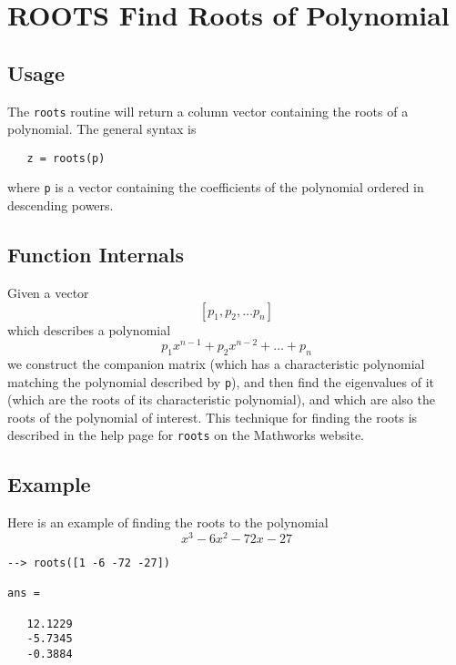 \section{ROOTS Find Roots of Polynomial}

\subsection{Usage}

The \verb|roots| routine will return a column vector containing the
roots of a polynomial.  The general syntax is
\begin{verbatim}
   z = roots(p)
\end{verbatim}
where \verb|p| is a vector containing the coefficients of the polynomial
ordered in descending powers.  
\subsection{Function Internals}

Given a vector 
\[
   [p_1, p_2, \dots p_n]
\]
which describes a polynomial
\[
   p_1 x^{n-1} + p_2 x^{n-2} + \dots + p_n
\]
we construct the companion matrix (which has a characteristic polynomial
matching the polynomial described by \verb|p|), and then find the eigenvalues
of it (which are the roots of its characteristic polynomial), and
which are also the roots of the polynomial of interest.  This technique
for finding the roots is described in the help page for \verb|roots| on the Mathworks
website.
\subsection{Example}

Here is an example of finding the roots to the polynomial
\[
   x^3 - 6x^2 - 72x - 27
\]
\begin{verbatim}
--> roots([1 -6 -72 -27])

ans = 

   12.1229 
   -5.7345 
   -0.3884 
\end{verbatim}
